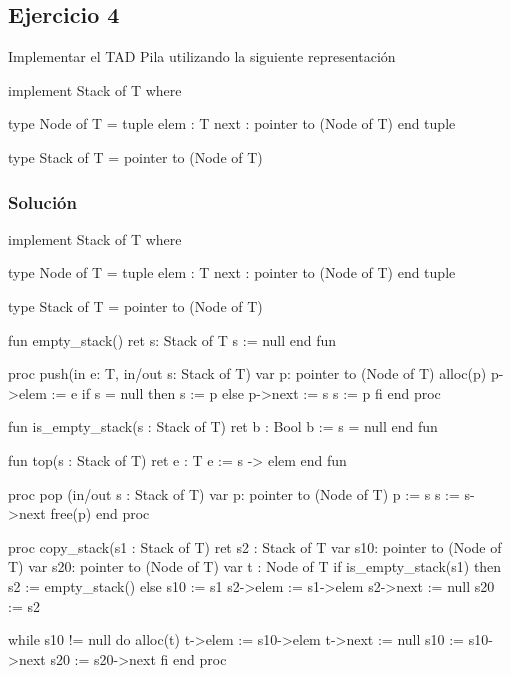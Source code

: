 \newpage
\subsection{Ejercicio 4}
Implementar el TAD Pila utilizando la siguiente representación
\begin{codebox}
\begin{pascallike}
implement Stack of T where

type Node of T = tuple
                    elem : T
                    next : pointer to (Node of T)
                 end tuple

type Stack of T = pointer to (Node of T)      
\end{pascallike}
\end{codebox}
\subsubsection{Solución}

\begin{codebox}
\begin{pascallike}
implement Stack of T where

type Node of T = tuple
                    elem : T
                    next : pointer to (Node of T)
                 end tuple

type Stack of T = pointer to (Node of T)

fun empty_stack() ret s: Stack of T
    s := null
end fun

proc push(in e: T, in/out s: Stack of T)
    var p: pointer to (Node of T)
    alloc(p)
    p->elem := e
    if s = null then
        s := p
    else
        p->next := s
        s := p
    fi
end proc 

fun is_empty_stack(s : Stack of T) ret b : Bool
    b := s = null
end fun
\end{pascallike}
\end{codebox}

\begin{codebox}
\begin{pascallike}
fun top(s : Stack of T) ret e : T
    e := s -> elem
end fun

proc pop (in/out s : Stack of T)
    var p: pointer to (Node of T)
    p := s
    s := s->next
    free(p)
end proc

proc copy_stack(s1 : Stack of T) ret s2 : Stack of T
    var s10: pointer to (Node of T)
    var s20: pointer to (Node of T)
    var t : Node of T
    if is_empty_stack(s1) then
        s2 := empty_stack()
    else
        s10 := s1 
        s2->elem := s1->elem
        s2->next := null
        s20 := s2

    while s10 != null do
        alloc(t)
        t->elem := s10->elem
        t->next := null
        s10 := s10->next
        s20 := s20->next
    fi
end proc
\end{pascallike}
\end{codebox}

